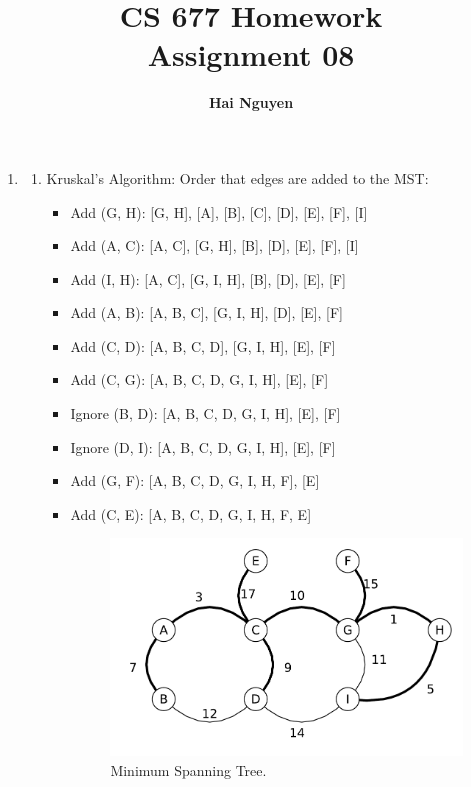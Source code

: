 \documentclass[11pts]{report}
\title{CS 677 Homework \\ Assignment 08}
\author{\textbf{Hai Nguyen}}
\begin{document}
\maketitle

\begin{enumerate}

\item 

\begin{enumerate} 
\item Kruskal's Algorithm: Order that edges are added to the MST:

\begin{itemize}
\item Add (G, H): [G, H], [A], [B], [C], [D], [E], [F], [I]
\item Add (A, C): [A, C], [G, H], [B], [D], [E], [F], [I]
\item Add (I, H): [A, C], [G, I, H], [B], [D], [E], [F]
\item Add (A, B): [A, B, C], [G, I, H], [D], [E], [F] 
\item Add (C, D): [A, B, C, D], [G, I, H], [E], [F]
\item Add (C, G): [A, B, C, D, G, I, H], [E], [F]
\item Ignore (B, D): [A, B, C, D, G, I, H], [E], [F]
\item Ignore (D, I): [A, B, C, D, G, I, H], [E], [F]
\item Add (G, F): [A, B, C, D, G, I, H, F], [E]
\item Add (C, E): [A, B, C, D, G, I, H, F, E]

\begin{figure}[htbp]
\begin{center}
\includegraphics[scale=0.5]{1.pdf}
\caption{Minimum Spanning Tree.}
\label{Fig:1}
\end{center}
\end{figure}


\end{itemize}
\end{enumerate}
\end{enumerate}
\end{document}
